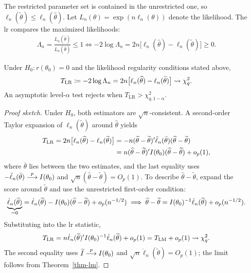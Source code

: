 \documentclass[a4paper,12pt]{article}
\begin{document}
The restricted parameter set is contained in the unrestricted one, so
$\ell_n(\widetilde\theta)\le\ell_n(\widehat\theta)$.
Let $L_n(\theta)=\exp(n\ell_n(\theta))$ denote the likelihood.
The \gls{lr} compares the maximized likelihoods:
\begin{align}
	\Lambda_n=\frac{L_n(\widetilde\theta)}{L_n(\widehat\theta)}\le1
	\iff
	-2\log\Lambda_n=2n\big[\ell_n(\widehat\theta)-\ell_n(\widetilde\theta)\big]\ge0.
\end{align}

\begin{theorem}\label{thm-lr}
	Under $H_0:r(\theta_0)=0$ and the likelihood regularity conditions stated above,
	\begin{align}
		T_{\mathrm{LR}}
		\coloneqq-2\log\Lambda_n
		=2n\big[\ell_n(\widehat\theta)-\ell_n(\widetilde\theta)\big]
		\overset{}{\leadsto}\chi_q^2.\label{eq-lr}
	\end{align}
	An asymptotic level-$\alpha$ test rejects when $T_{\mathrm{LR}}>\chi^2_{q,1-\alpha}$.
\end{theorem}

\begin{proof}[Proof sketch]
	Under $H_0$, both estimators are $\sqrt n$-consistent.
	A second-order Taylor expansion of $\ell_n(\widetilde\theta)$ around $\widehat\theta$ yields
	\begin{align*}
		T_{\mathrm{LR}}
		=2n\big[\ell_n(\widehat\theta)-\ell_n(\widetilde\theta)\big]
		&= -n(\widehat\theta-\widetilde\theta)^{\prime} \ddot\ell_n(\bar\theta) (\widehat\theta-\widetilde\theta) \\
		&= n(\widehat\theta-\widetilde\theta)^{\prime} I(\theta_0)(\widehat\theta-\widetilde\theta)+o_p(1),
	\end{align*}
	where $\bar\theta$ lies between the two estimates,
	and the last equality uses $-\ddot\ell_n(\bar\theta)\overset{p}{\longrightarrow} I(\theta_0)$ and $\sqrt n(\widehat\theta-\widetilde\theta)=O_p(1)$.
	To describe $\widehat\theta-\widetilde\theta$,
	expand the score around $\widetilde\theta$ and use the unrestricted first-order condition:
	\begin{align*}
		\underbrace{\dot\ell_n(\widehat\theta)}_{=0}
		=\dot\ell_n(\widetilde\theta)-I(\theta_0)(\widehat\theta-\widetilde\theta)+o_p(n^{-1/2})
		\implies
		\widehat\theta-\widetilde\theta
		=I(\theta_0)^{-1}\dot\ell_n(\widetilde\theta)+o_p(n^{-1/2}).
	\end{align*}
	Substituting into the \gls{lr} statistic,
	\begin{align*}
		T_{\mathrm{LR}}
		=n\dot\ell_n(\widetilde\theta)^{\prime} I(\theta_0)^{-1}\dot\ell_n(\widetilde\theta)+o_p(1)
		=T_{\mathrm{LM}}+o_p(1)\overset{}{\leadsto}\chi_q^2.
	\end{align*}
	The second equality uses $\widetilde I\overset{p}{\longrightarrow} I(\theta_0)$ and
	$\sqrt n\dot\ell_n(\widetilde\theta)=O_p(1)$; the limit follows from Theorem~\ref{thm-lm}.
\end{proof}
\end{document}
